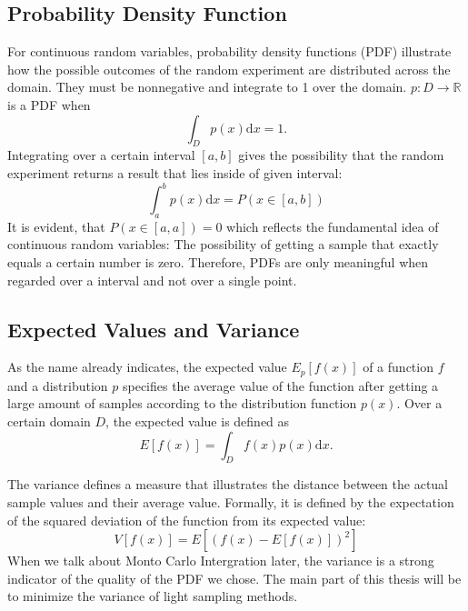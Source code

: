 \subsection{Probability Density Function}

For continuous random variables, probability density functions (PDF) illustrate how the possible outcomes of the random experiment are distributed across the domain. They must be nonnegative and integrate to 1 over the domain. $p:D \rightarrow \mathbb{R}$ is a PDF when
\begin{equation}
\int_{D}p(x)\mathrm{d}x = 1.
\end{equation}
Integrating over a certain interval $[a, b]$ gives the possibility that the random experiment returns a result that lies inside of given interval:
\begin{equation}
\int_{a}^{b}p(x)\mathrm{d}x = P(x \in [a, b])
\end{equation}
It is evident, that $P(x \in [a, a]) = 0$ which reflects the fundamental idea of continuous random variables: The possibility of getting a sample that exactly equals a certain number is zero. Therefore, PDFs are only meaningful when regarded over a interval and not over a single point.

\subsection{Expected Values and Variance}

As the name already indicates, the expected value $E_p[f(x)]$ of a function $f$ and a distribution $p$ specifies the average value of the function after getting a large amount of samples according to the distribution function $p(x)$. Over a certain domain $D$, the expected value is defined as
\begin{equation}
E[f(x)] = \int_{D}f(x)p(x)\mathrm{d}x.
\end{equation}

The variance defines a measure that illustrates the distance between the actual sample values and their average value. Formally, it is defined by the expectation of the squared deviation of the function from its expected value:
\begin{equation}
V[f(x)] = E[(f(x) - E[f(x)])^2]
\end{equation}
When we talk about Monto Carlo Intergration later, the variance is a strong indicator of the quality of the PDF we chose. The main part of this thesis will be to minimize the variance of light sampling methods.

